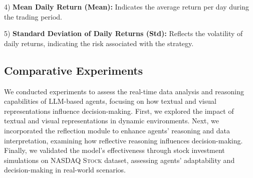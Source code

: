 4) \textbf{Mean Daily Return (Mean):} Indicates the average return per day during the trading period.

5) \textbf{Standard Deviation of Daily Returns (Std):} Reflects the volatility of daily returns, indicating the risk associated with the strategy.

\subsection{Comparative Experiments}

We conducted experiments to assess the real-time data analysis and reasoning capabilities of LLM-based agents, focusing on how textual and visual representations influence decision-making. First, we explored the impact of textual and visual representations in dynamic environments. Next, we incorporated the reflection module to enhance agents' reasoning and data interpretation, examining how reflective reasoning influences decision-making. Finally, we validated the model's effectiveness through stock investment simulations on \textsc{NASDAQ Stock} dataset, assessing agents' adaptability and decision-making in real-world scenarios.


